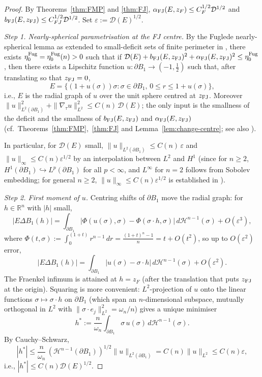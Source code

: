 \documentclass[11pt]{article}
\theoremstyle{definition}
\newcommand{\R}{\mathbb{R}}
\newcommand{\Hn}{\mathcal H^{n-1}}
\newcommand{\dD}{\mathcal D}
\newcommand{\alphaFJ}{\alpha_{\rm FJ}}
\newcommand{\bFJ}{b_{\rm FJ}}
\newcommand{\eps}{\varepsilon}
\begin{document}
\begin{proof}
By Theorems~\ref{thm:FMP} and \ref{thm:FJ},
\(\alphaFJ(E,z_F)\le C_F^{1/2}\dD^{1/2}\) and
\(\bFJ(E,z_{\rm FJ})\le C_{FJ}^{1/2}\dD^{1/2}\).  Set
\(\eps:=\dD(E)^{1/2}\).

\smallskip\emph{Step 1.  Nearly-spherical parametrisation at the FJ
centre.}  By the Fuglede nearly-spherical lemma
\cite[Lemma~1]{Fuglede1989} as extended to small-deficit sets of
finite perimeter in \cite[Theorem~3.4]{CicaleseLeonardi2012}, there
exists \(\eta_{0}^{\rm Fug}=\eta_{0}^{\rm Fug}(n)>0\) such that if
\(\dD(E)+\bFJ(E,z_{\rm FJ})^{2}+\alphaFJ(E,z_{\rm FJ})^{2}
\le\eta_{0}^{\rm Fug}\), then there exists a Lipschitz function
\(u:\partial B_1\to(-1,\tfrac12)\) such that, after translating so
that \(z_{\rm FJ}=0\),
\[
   E=\{(1+u(\sigma))\sigma:\sigma\in\partial B_1,\,
   0\le r\le 1+u(\sigma)\},
\]
i.e., \(E\) is the radial graph of \(u\) over the unit sphere
centred at \(z_{\rm FJ}\).  Moreover
\(\|u\|_{L^{2}(\partial B_1)}^{2}+\|\nabla_{\!\tau}u\|_{L^{2}}^{2}
\le C(n)\,\dD(E)\); the only input is the smallness of the deficit and
the smallness of \(\bFJ(E,z_{\rm FJ})\) and
\(\alphaFJ(E,z_{\rm FJ})\) (cf.\ Theorems~\ref{thm:FMP},~\ref{thm:FJ}
and Lemma~\ref{lem:change-centre}; see also
\cite[Lemma~3.1]{FuscoJulin2014}).

In particular, for \(\dD(E)\) small,
\(\|u\|_{L^{2}(\partial B_1)}\le C(n)\,\eps\) and \(\|u\|_{\infty}\le
C(n)\eps^{1/2}\) by an interpolation between \(L^{2}\) and \(H^{1}\)
(since for \(n\ge2\), \(H^{1}(\partial B_1)\hookrightarrow
L^{p}(\partial B_1)\) for all \(p<\infty\), and \(L^{\infty}\) for
\(n=2\) follows from Sobolev embedding; for general \(n\ge2\),
\(\|u\|_{\infty}\le C(n)\eps^{1/2}\) is established in
\cite[Eq.~(2.3)]{FuscoJulin2014}).

\smallskip\emph{Step 2.  First moment of \(u\).}  Centring shifts of
\(\partial B_1\) move the radial graph: for \(h\in\R^{n}\) with
\(|h|\) small,
\[
   |E\Delta B_1(h)|
   =\int_{\partial B_1}\bigl|\Phi(u(\sigma),\sigma)-
                            \Phi(\sigma\cdot h,\sigma)\bigr|\,d\Hn(\sigma)
   + O(\eps^{3}),
\]
where \(\Phi(t,\sigma):=\int_{0}^{(1+t)}r^{n-1}\,dr=
\tfrac{(1+t)^{n}-1}{n}=t+O(t^{2})\), so up to
\(O(\eps^{2})\) error,
\[
   |E\Delta B_1(h)|
   =\int_{\partial B_1}|u(\sigma)-\sigma\cdot h|\,d\Hn(\sigma)
   + O(\eps^{2}).
\]
The Fraenkel infimum is attained at \(h=z_F\) (after the translation
that puts \(z_{\rm FJ}\) at the origin).  Squaring is more convenient:
\(L^{2}\)-projection of \(u\) onto the linear functions
\(\sigma\mapsto\sigma\cdot h\) on \(\partial B_1\) (which span an
\(n\)-dimensional subspace, mutually orthogonal in \(L^{2}\) with
\(\|\sigma\cdot e_j\|_{L^{2}}^{2}=\omega_n/n\)) gives a unique
minimiser
\[
   h^{\ast}:=\frac{n}{\omega_n}\int_{\partial B_1}\sigma\,u(\sigma)\,
       d\Hn(\sigma).
\]
By Cauchy--Schwarz,
\[
   |h^{\ast}|\le \frac{n}{\omega_n}
   \,(\Hn(\partial B_1))^{1/2}\|u\|_{L^{2}(\partial B_1)}
   = C(n)\|u\|_{L^{2}}\le C(n)\eps,
\]
i.e., \(|h^{\ast}|\le C(n)\dD(E)^{1/2}\).


\end{proof}
\end{document}
